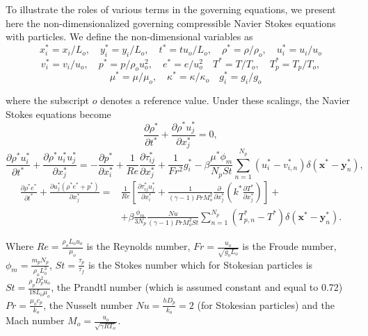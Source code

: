 \documentclass[a4paper,10pt]{report}
\begin{document}
To illustrate the roles of various terms in the governing equations, we present here the non-dimensionalized governing compressible Navier Stokes equations with particles. We define the non-dimensional variables as
\begin{equation}
x_i^*=x_i/L_o, \quad y_i^*=y_i/L_o, \quad t^*=tu_o/L_o, \quad \rho^*=\rho/\rho_o, \quad u_i^*=u_i/u_o	
\end{equation}
\begin{equation}
v_i^*=v_i/u_o, \quad p^*=p/\rho_o u_o^2, \quad e^*=e/u_o^2 \quad T^*=T/T_o, \quad T_p^* = T_p / T_o, 
\end{equation}
\begin{equation}
\quad \mu^* = \mu / \mu_o, \quad \kappa^* = \kappa / \kappa_o \quad g^*_i = g_i / g_o	
\end{equation}

where the subscript $o$ denotes a reference value. Under these scalings, the Navier Stokes equations become
\begin{equation}
\label{eq:NS_cont_nd}
\frac{\partial \rho^*}{\partial t^*} + \frac{\partial \rho^* u_j^*}{\partial x_j^*} = 0,	
\end{equation}
\begin{equation}
\label{eq:NS_mom_nd}
\frac{\partial \rho^* u_i^*}{\partial t^*} + \frac{\partial \rho^* u_i^* u_j^*}{\partial x_j^*} = - \frac{\partial p^*}{\partial x_i^*} + \frac{1}{Re}\frac{\partial \tau_{ij}^*}{\partial x_j^*} + \frac{1}{Fr^2} g_i^* - \beta\frac{\mu^* \phi_m}{N_p St}  \sum_{n=1}^{N_p} (u_i^*-v_{i,n}^*)\delta(\mathbf{x}^* - \mathbf{y}_n^* ),	
\end{equation}
\begin{equation}
\label{eq:NS_en_nd}
\begin{split}
\frac{\partial \rho^* e^*}{\partial t^*} + \frac{\partial u_j^* (\rho^* e^* + p^*)}{\partial x_j^*} = & \frac{1}{Re}\left[\frac{\partial \tau_{ij}^* u_j^*}{\partial x_i^*} + \frac{1}{(\gamma-1)Pr M_o^2}\frac{\partial}{\partial x_j^*}\left( k^* \frac{\partial T^*}{\partial x_j^*}\right)\right]+ \\
& + \beta \frac{\phi_m}{3N_p} \frac{Nu}{(\gamma-1)Pr M_o^2St}\sum_{n=1}^{N_p} (T_{p,n}^* - T^*) \delta(\mathbf{x}^* - \mathbf{y}_n^* ).
\end{split}
\end{equation}

Where $Re=\frac{\rho_o L_o u_o}{\mu_o}$ is the Reynolds number, $Fr=\frac{u_o}{\sqrt{g_o L_o}}$ is the Froude number, $\phi_m=\frac{m_p N_p}{\rho_o L_o^3}$, $St=\frac{\tau_p}{\tau_f}$ is the Stokes number which for Stokesian particles is $St=\frac{\rho_p D_p^2 u_o}{18 L_o \mu_o}$, the Prandtl number (which is assumed constant and equal to 0.72) $Pr=\frac{\mu_o c_p}{k_o}$, the Nusselt number $Nu=\frac{h D_p}{k_o}=2$ (for Stokesian particles) and  the Mach number $M_o=\frac{u_o}{\sqrt{\gamma R T_o}}$. 
\end{document}
